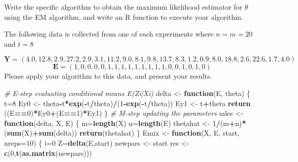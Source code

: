 \documentclass[]{article}
\newenvironment{Shaded}{\begin{snugshade}}{\end{snugshade}}
\newcommand{\CommentTok}[1]{\textcolor[rgb]{0.56,0.35,0.01}{\textit{#1}}}
\newcommand{\ControlFlowTok}[1]{\textcolor[rgb]{0.13,0.29,0.53}{\textbf{#1}}}
\newcommand{\DataTypeTok}[1]{\textcolor[rgb]{0.13,0.29,0.53}{#1}}
\newcommand{\DecValTok}[1]{\textcolor[rgb]{0.00,0.00,0.81}{#1}}
\newcommand{\KeywordTok}[1]{\textcolor[rgb]{0.13,0.29,0.53}{\textbf{#1}}}
\newcommand{\NormalTok}[1]{#1}
\newcommand{\OperatorTok}[1]{\textcolor[rgb]{0.81,0.36,0.00}{\textbf{#1}}}
\newcommand{\StringTok}[1]{\textcolor[rgb]{0.31,0.60,0.02}{#1}}
\begin{document}
Write the specific algorithm to obtain the maximum likelihood estimator
for \(\theta\) using the EM algorithm, and write an R function to
execute your algorithm.

\vskip 10pt

The following data is collected from one of such experiments where
\(n=m=20\) and \(t=8\)

\[\mathbf{Y} = (4.0, 12.8, 2.9, 27.2, 2.9, 3.1, 11.2, 9.0, 8.1, 9.8, 13.7, 8.3, 1.2, 0.9, 8.0, 18.8, 2.6, 22.6, 1.7, 4.0)\]
\[\mathbf{E}=(1,  0,  0,  0 , 0 , 1,  1,  1,  1,  1,  1,  1, 1, 1, 0, 0, 1, 0, 1, 0)\]
Please apply your algorithm to this data, and present your results.

\begin{Shaded}
\begin{Highlighting}[]
\CommentTok{# E-step evaluating conditional means E(Zi|Xi)}
\NormalTok{delta <-}\StringTok{ }\ControlFlowTok{function}\NormalTok{(E, theta)}
\NormalTok{\{  t=}\DecValTok{8}
\NormalTok{  Ey0 <-}\StringTok{ }\NormalTok{theta}\OperatorTok{-}\NormalTok{t}\OperatorTok{*}\KeywordTok{exp}\NormalTok{(}\OperatorTok{-}\NormalTok{t}\OperatorTok{/}\NormalTok{theta)}\OperatorTok{/}\NormalTok{(}\DecValTok{1}\OperatorTok{-}\KeywordTok{exp}\NormalTok{(}\OperatorTok{-}\NormalTok{t}\OperatorTok{/}\NormalTok{theta))}
\NormalTok{  Ey1 <-}\StringTok{ }\NormalTok{t}\OperatorTok{+}\NormalTok{theta}
  \KeywordTok{return}\NormalTok{ ((E}\OperatorTok{==}\DecValTok{0}\NormalTok{)}\OperatorTok{*}\NormalTok{Ey0}\OperatorTok{+}\NormalTok{(E}\OperatorTok{==}\DecValTok{1}\NormalTok{)}\OperatorTok{*}\NormalTok{Ey1)}
\NormalTok{\}}
\CommentTok{# M-step updating the parameters}
\NormalTok{mles <-}\StringTok{ }\ControlFlowTok{function}\NormalTok{(delta, X, E)}
\NormalTok{\{}
\NormalTok{  m=}\KeywordTok{length}\NormalTok{(X)}
\NormalTok{  n=}\KeywordTok{length}\NormalTok{(E)}
\NormalTok{  thetahat <-}\StringTok{ }\DecValTok{1}\OperatorTok{/}\NormalTok{(m}\OperatorTok{+}\NormalTok{n)}\OperatorTok{*}\NormalTok{(}\KeywordTok{sum}\NormalTok{(X)}\OperatorTok{+}\KeywordTok{sum}\NormalTok{(delta))}
  \KeywordTok{return}\NormalTok{(thetahat)}
\NormalTok{\}}
\NormalTok{Emix <-}\StringTok{ }\ControlFlowTok{function}\NormalTok{(X, E, start, }\DataTypeTok{nreps=}\DecValTok{10}\NormalTok{)}
\NormalTok{\{}
\NormalTok{  i=}\DecValTok{0}
\NormalTok{  Z=}\KeywordTok{delta}\NormalTok{(E,start)}
\NormalTok{  newpars <-}\StringTok{ }\NormalTok{start}
\NormalTok{  res <-}\StringTok{ }\KeywordTok{c}\NormalTok{(}\DecValTok{0}\NormalTok{,}\KeywordTok{t}\NormalTok{(}\KeywordTok{as.matrix}\NormalTok{(newpars)))}

\end{Highlighting}
\end{Shaded}
\end{document}
